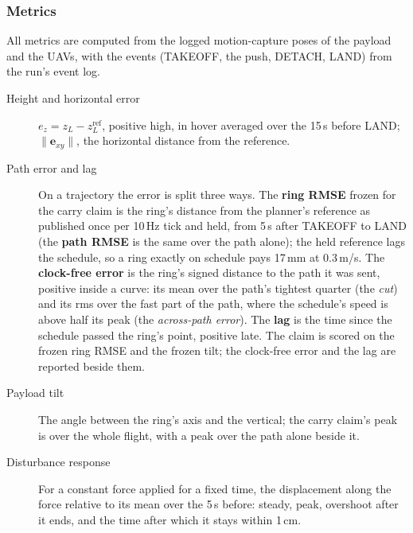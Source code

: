 
\subsubsection{Metrics}
\label{sec:metrics}

All metrics are computed from the logged motion-capture poses of the payload and the UAVs, with the
events (TAKEOFF, the push, DETACH, LAND) from the run's event log.
\begin{description}
    \item[Height and horizontal error] $e_z = z_L - z_L^{\mathrm{ref}}$, positive high, in hover averaged over the
    15\,s before LAND; $\|\mathbf{e}_{xy}\|$, the horizontal distance from the reference.
\item[Path error and lag] On a trajectory the error is split three ways. The \textbf{ring RMSE} frozen for the
    carry claim is the ring's distance from the planner's reference as published once per 10\,Hz tick and held, from
    5\,s after TAKEOFF to LAND (the \textbf{path RMSE} is the same over the path alone); the held reference lags the schedule, so a ring exactly on schedule pays 17\,mm at
    0.3\,m/s. The \textbf{clock-free error} is the ring's signed distance to the path it was sent, positive inside
    a curve: its mean over the path's tightest quarter (the \emph{cut}) and its rms over the fast part of the path,
    where the schedule's speed is above half its peak (the \emph{across-path error}). The \textbf{lag} is the time
    since the schedule passed the ring's point, positive late. The claim is scored on the frozen ring RMSE and the frozen
    tilt; the clock-free error and the lag are reported beside them.
    \item[Payload tilt] The angle between the ring's axis and the vertical; the carry claim's peak is over the whole
    flight, with a peak over the path alone beside it.
    \item[Disturbance response] For a constant force applied for a fixed time, the displacement along the
    force relative to its mean over the 5\,s before: steady, peak, overshoot after it ends, and the time after which it
    stays within 1\,cm.

\end{description}
